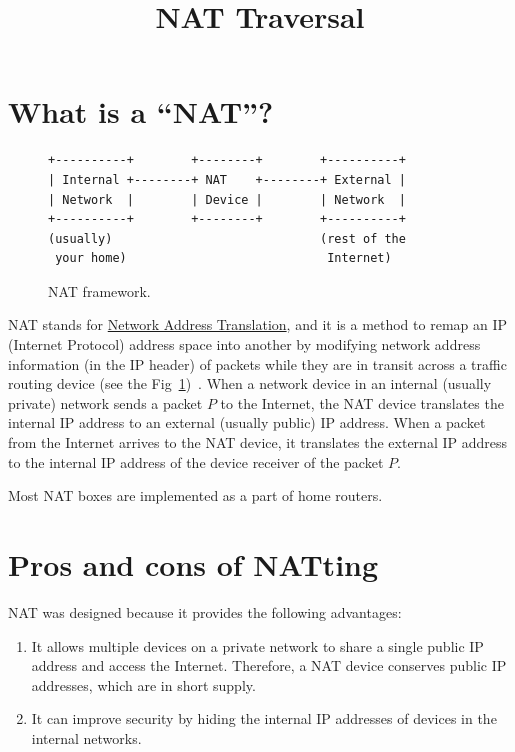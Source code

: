 
\title{NAT Traversal}

\maketitle
\tableofcontents

\section{What is a ``NAT''?}

\begin{figure}
\begin{verbatim}
+----------+        +--------+        +----------+
| Internal +--------+ NAT    +--------+ External |
| Network  |        | Device |        | Network  |
+----------+        +--------+        +----------+
(usually)                             (rest of the
 your home)                            Internet)
\end{verbatim}
\caption{NAT framework.}
\label{fig:NAT_framework}
\end{figure}

NAT stands for
\href{https://en.wikipedia.org/wiki/Network_address_translation}{Network
  Address Translation}, and it is a method to remap an IP
(Internet Protocol) address space into another by modifying network
address information (in the IP header) of packets while they are in
transit across a traffic routing device (see the
Fig~\ref{fig:NAT_framework})~\cite{srisuresh1999nat,Srisuresh2001}. When
a network device in an internal (usually private) network sends a
packet $P$ to the Internet, the NAT device translates the internal IP
address to an external (usually public) IP address. When a packet from
the Internet arrives to the NAT device, it translates the external IP
address to the internal IP address of the device receiver of the
packet $P$.

Most NAT boxes are implemented as a part of home routers.


\section{Pros and cons of NATting}

NAT was designed because it provides the following advantages:
\begin{enumerate}
\item It allows multiple devices on a private network to share a
  single public IP address and access the Internet. Therefore, a NAT
  device conserves public IP addresses, which are in short supply.
\item It can improve security by hiding the internal IP addresses of
  devices in the internal networks.
\end{enumerate}

